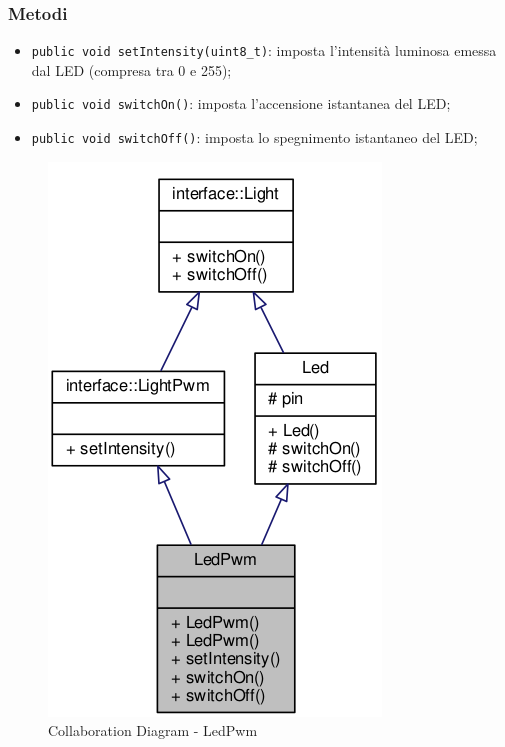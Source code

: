 \subsubsection{Metodi}
\begin{itemize}
	\item \texttt{public void setIntensity(uint8\_t)}: imposta l'intensità luminosa emessa dal LED (compresa tra 0 e 255);
	\item \texttt{public void switchOn()}: imposta l'accensione istantanea del LED;
	\item \texttt{public void switchOff()}: imposta lo spegnimento istantaneo del LED;
\end{itemize}
\begin{figure}[!ht]
	\centering
	\includegraphics[scale=.4]{img/UML/CollaborationDiagram/LedPwm.png}
	\caption{Collaboration Diagram - LedPwm}
\end{figure}
